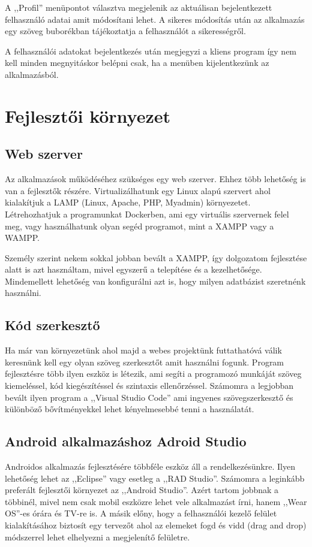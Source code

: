 \documentclass[
]{thesis-ekf}
\theoremstyle{definition}
\theoremstyle{remark}
\begin{document}
A ,,Profil'' menüpontot választva megjelenik az aktuálisan bejelentkezett felhasználó adatai amit módosítani lehet. A sikeres módosítás után az alkalmazás egy szöveg buborékban tájékoztatja a felhasználót a sikerességről. 

A felhasználói adatokat bejelentkezés után megjegyzi a kliens program így nem kell minden megnyitáskor belépni csak, ha a menüben kijelentkezünk az alkalmazásból. 

\chapter{Fejlesztői környezet}
\section{Web szerver}
Az alkalmazások működéséhez szükséges egy web szerver. Ehhez több lehetőség is van a fejlesztők részére. Virtualizálhatunk egy Linux alapú szervert ahol kialakítjuk a LAMP (Linux, Apache, PHP, Myadmin) környezetet. Létrehozhatjuk a programunkat Dockerben, ami egy virtuális szervernek felel meg, vagy használhatunk olyan segéd programot, mint a XAMPP vagy a WAMPP. 

Személy szerint nekem sokkal jobban bevált a XAMPP, így dolgozatom fejlesztése alatt is azt használtam, mivel egyszerű a telepítése és a kezelhetősége. Mindemellett lehetőség van konfigurálni azt is, hogy milyen adatbázist szeretnénk használni. 

\section{Kód szerkesztő}
Ha már van környezetünk ahol majd a webes projektünk futtathatóvá válik keresnünk kell egy olyan szöveg szerkesztőt amit használni fogunk. Program fejlesztésre több ilyen eszköz is létezik, ami segíti a programozó munkáját szöveg kiemeléssel, kód kiegészítéssel és szintaxis ellenőrzéssel. Számomra a legjobban bevált ilyen program a ,,Visual Studio Code'' ami ingyenes szövegszerkesztő és különböző bővítményekkel lehet kényelmesebbé tenni a használatát.

\section{Android alkalmazáshoz Adroid Studio}
Androidos alkalmazás fejlesztésére többféle eszköz áll a rendelkezésünkre. Ilyen lehetőség lehet az ,,Eclipse'' vagy esetleg a ,,RAD Studio''. Számomra a leginkább preferált fejlesztői környezet az ,,Android Studio''. Azért tartom jobbnak a többinél, mivel nem csak mobil eszközre lehet vele alkalmazást írni, hanem ,,Wear OS''-es órára és TV-re is. A másik előny, hogy a felhasználói kezelő felület kialakításához biztosít egy tervezőt ahol az elemeket fogd és vidd (drag and drop) módszerrel lehet elhelyezni a megjelenítő felületre. 
\end{document}
